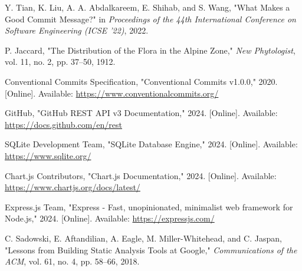 \documentclass[12pt,a4paper]{article}
\begin{document}
\noindent [6] Y. Tian, K. Liu, A. A. Abdalkareem, E. Shihab, and S. Wang, "What Makes a Good Commit Message?" in \emph{Proceedings of the 44th International Conference on Software Engineering (ICSE '22)}, 2022.

\noindent [7] P. Jaccard, "The Distribution of the Flora in the Alpine Zone," \emph{New Phytologist}, vol. 11, no. 2, pp. 37--50, 1912.

\noindent [8] Conventional Commits Specification, "Conventional Commits v1.0.0," 2020. [Online]. Available: \url{https://www.conventionalcommits.org/}

\noindent [9] GitHub, "GitHub REST API v3 Documentation," 2024. [Online]. Available: \url{https://docs.github.com/en/rest}

\noindent [10] SQLite Development Team, "SQLite Database Engine," 2024. [Online]. Available: \url{https://www.sqlite.org/}

\noindent [11] Chart.js Contributors, "Chart.js Documentation," 2024. [Online]. Available: \url{https://www.chartjs.org/docs/latest/}

\noindent [12] Express.js Team, "Express - Fast, unopinionated, minimalist web framework for Node.js," 2024. [Online]. Available: \url{https://expressjs.com/}

\noindent [13] C. Sadowski, E. Aftandilian, A. Eagle, M. Miller-Whitehead, and C. Jaspan, "Lessons from Building Static Analysis Tools at Google," \emph{Communications of the ACM}, vol. 61, no. 4, pp. 58--66, 2018.
\end{document}
